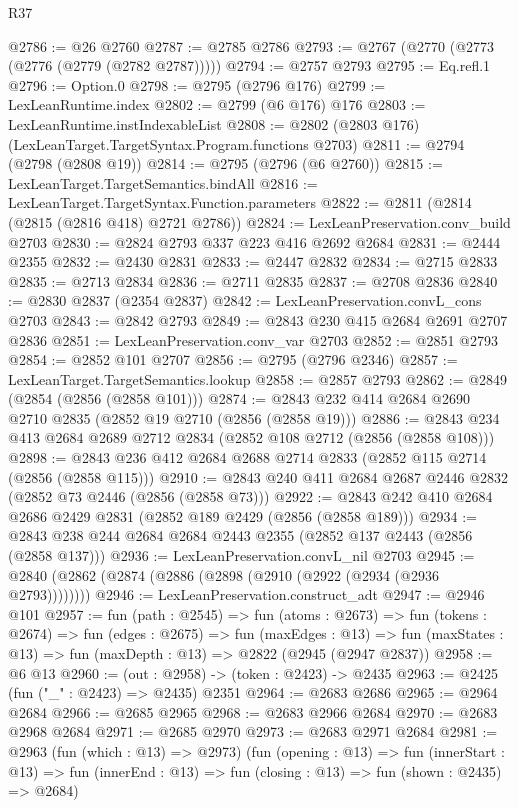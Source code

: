 \begin{lexlean}{R37}
\begin{coremodule}
@2786 := @26 @2760
@2787 := @2785 @2786
@2793 := @2767 (@2770 (@2773 (@2776 (@2779 (@2782 @2787)))))
@2794 := @2757 @2793
@2795 := Eq.refl.{1}
@2796 := Option.{0}
@2798 := @2795 (@2796 @176)
@2799 := LexLeanRuntime.index
@2802 := @2799 (@6 @176) @176
@2803 := LexLeanRuntime.instIndexableList
@2808 := @2802 (@2803 @176) (LexLeanTarget.TargetSyntax.Program.functions @2703)
@2811 := @2794 (@2798 (@2808 @19))
@2814 := @2795 (@2796 (@6 @2760))
@2815 := LexLeanTarget.TargetSemantics.bindAll
@2816 := LexLeanTarget.TargetSyntax.Function.parameters
@2822 := @2811 (@2814 (@2815 (@2816 @418) @2721 @2786))
@2824 := LexLeanPreservation.conv_build @2703
@2830 := @2824 @2793 @337 @223 @416 @2692 @2684
@2831 := @2444 @2355
@2832 := @2430 @2831
@2833 := @2447 @2832
@2834 := @2715 @2833
@2835 := @2713 @2834
@2836 := @2711 @2835
@2837 := @2708 @2836
@2840 := @2830 @2837 (@2354 @2837)
@2842 := LexLeanPreservation.convL_cons @2703
@2843 := @2842 @2793
@2849 := @2843 @230 @415 @2684 @2691 @2707 @2836
@2851 := LexLeanPreservation.conv_var @2703
@2852 := @2851 @2793
@2854 := @2852 @101 @2707
@2856 := @2795 (@2796 @2346)
@2857 := LexLeanTarget.TargetSemantics.lookup
@2858 := @2857 @2793
@2862 := @2849 (@2854 (@2856 (@2858 @101)))
@2874 := @2843 @232 @414 @2684 @2690 @2710 @2835 (@2852 @19 @2710 (@2856 (@2858 @19)))
@2886 := @2843 @234 @413 @2684 @2689 @2712 @2834 (@2852 @108 @2712 (@2856 (@2858 @108)))
@2898 := @2843 @236 @412 @2684 @2688 @2714 @2833 (@2852 @115 @2714 (@2856 (@2858 @115)))
@2910 := @2843 @240 @411 @2684 @2687 @2446 @2832 (@2852 @73 @2446 (@2856 (@2858 @73)))
@2922 := @2843 @242 @410 @2684 @2686 @2429 @2831 (@2852 @189 @2429 (@2856 (@2858 @189)))
@2934 := @2843 @238 @244 @2684 @2684 @2443 @2355 (@2852 @137 @2443 (@2856 (@2858 @137)))
@2936 := LexLeanPreservation.convL_nil @2703
@2945 := @2840 (@2862 (@2874 (@2886 (@2898 (@2910 (@2922 (@2934 (@2936 @2793))))))))
@2946 := LexLeanPreservation.construct_adt
@2947 := @2946 @101
@2957 := fun (path : @2545) =>
  fun (atoms : @2673) =>
  fun (tokens : @2674) =>
  fun (edges : @2675) =>
  fun (maxEdges : @13) =>
  fun (maxStates : @13) => fun (maxDepth : @13) => @2822 (@2945 (@2947 @2837))
@2958 := @6 @13
@2960 := (out : @2958) -> (token : @2423) -> @2435
@2963 := @2425 (fun ("_" : @2423) => @2435) @2351
@2964 := @2683 @2686
@2965 := @2964 @2684
@2966 := @2685 @2965
@2968 := @2683 @2966 @2684
@2970 := @2683 @2968 @2684
@2971 := @2685 @2970
@2973 := @2683 @2971 @2684
@2981 := @2963
    (fun (which : @13) => @2973)
    (fun (opening : @13) =>
    fun (innerStart : @13) =>
    fun (innerEnd : @13) => fun (closing : @13) => fun (shown : @2435) => @2684)

\end{coremodule}
\end{lexlean}

